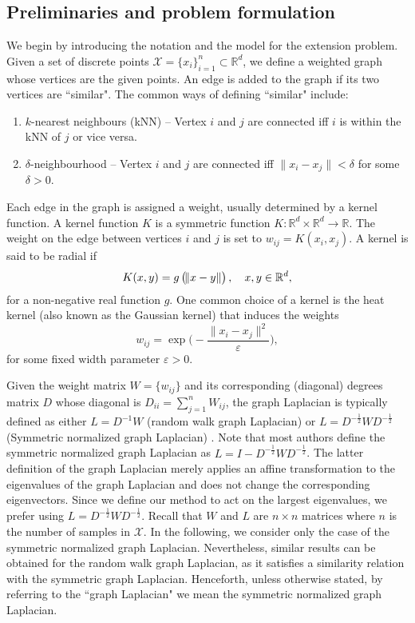 \documentclass[11pt]{article}
\begin{document}
\subsection{Preliminaries and problem formulation} \label{sec:prel}
We begin by introducing the notation and the model for the extension problem. Given a set of discrete points $\mathcal{X} = \{ x_i \}_{i=1}^n \subset \mathbb{R}^d $, we define a weighted graph whose vertices are the given points. An edge is added to the graph if its two vertices are ``similar". The common ways of defining ``similar" include:
\begin{enumerate}
	\item $k$-nearest neighbours (kNN) --  Vertex $i$ and $j$ are connected iff $i$ is within the kNN of $j$ or vice versa. 
	\item $\delta$-neighbourhood --  Vertex $i$ and $j$ are connected iff $\|x_i - x_j\| < \delta$ for some $\delta > 0$. 
\end{enumerate}
Each edge in the graph is assigned a weight, usually determined by a kernel function. A kernel function $K$ is a symmetric function $K \colon \mathbb{R}^d \times  \mathbb{R}^d \to \mathbb{R} $. The weight on the edge between vertices $i$ and $j$ is set to $w_{ij} = K(x_i, x_j)$. A kernel is said to be radial if 
\begin{equation} \label{eqn:radialKer}
K(x,y) = g \left(\norm{x-y} \right), \quad x,y \in \mathbb{R}^d ,
\end{equation}
for a non-negative real function $g$. One common choice of a kernel is the heat kernel (also known as the Gaussian kernel) that induces the weights
\begin{equation} \label{eqn:guass_ker}
w_{ij} = \exp \big( -\frac{\|x_i - x_j\|^2}{\varepsilon}  \big),
\end{equation}
for some fixed width parameter $\varepsilon > 0$.

Given the weight matrix $W = \{w_{ij} \}$ and its corresponding (diagonal) degrees matrix $D$ whose diagonal is $D_{ii} = \sum_{j=1}^{n}W_{ij}$, the graph Laplacian is typically defined as either $L=D^{-1}W$ (random walk graph Laplacian) or $L = D^{-\frac12}WD^{-\frac12}$ (Symmetric normalized graph Laplacian) \cite{belkin2003laplacian}. Note that most authors define the symmetric normalized graph Laplacian as $L = I - D^{-\frac12}WD^{-\frac12}$. The latter definition of the graph Laplacian merely applies an affine transformation to the eigenvalues of the graph Laplacian and does not change the corresponding eigenvectors. Since we define our method to act on the largest eigenvalues, we prefer using $L = D^{-\frac12}WD^{-\frac12}$. Recall that $W$ and $L$ are $n \times n$ matrices where $n$ is the number of samples in $\mathcal{X}$. In the following, we consider only the case of the symmetric normalized graph Laplacian. Nevertheless, similar results can be obtained for the random walk graph Laplacian, as it satisfies a similarity relation with the symmetric graph Laplacian. Henceforth, unless otherwise stated, by referring to the ``graph Laplacian" we mean the symmetric normalized graph Laplacian.
\end{document}
